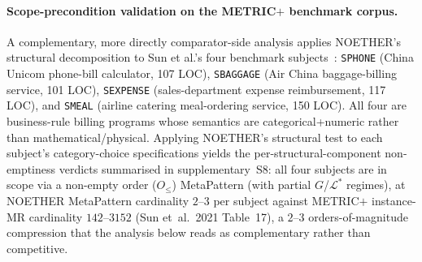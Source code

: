\documentclass[acmsmall,screen,review]{acmart}
\begin{document}
\paragraph{Scope-precondition validation on the METRIC$+$ benchmark corpus.}
\label{para:metricplus-sun2021-scope}
A complementary, more directly comparator-side analysis applies
NOETHER's structural decomposition to Sun et al.'s four
benchmark subjects~\cite{SunMETRICplus2021}: \texttt{SPHONE} (China
Unicom phone-bill calculator, 107 LOC), \texttt{SBAGGAGE} (Air China
baggage-billing service, 101 LOC), \texttt{SEXPENSE} (sales-department
expense reimbursement, 117 LOC), and \texttt{SMEAL} (airline catering
meal-ordering service, 150 LOC). All four are business-rule billing
programs whose semantics are categorical+numeric rather than
mathematical/physical. Applying NOETHER's structural test to each
subject's category-choice specifications yields the per-structural-component
non-emptiness verdicts summarised in supplementary~S8: all four subjects are in scope via a non-empty order ($O_{\le}$) MetaPattern (with partial $G$/$\mathcal{L}^{*}$ regimes), at NOETHER MetaPattern cardinality $2$--$3$ per subject against METRIC$+$ instance-MR cardinality $142$--$3152$ (Sun et~al.\ 2021 Table~17), a $2$--$3$ orders-of-magnitude compression that the analysis below reads as complementary rather than competitive.
\end{document}
